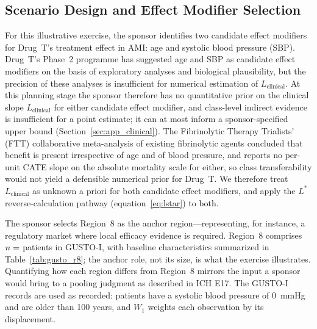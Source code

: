 \documentclass[AMA,Times1COL]{WileyNJDv5}
\begin{document}
\subsection{Scenario Design and Effect Modifier Selection}\label{sec:app_scenario}

For this illustrative exercise, the sponsor identifies two candidate effect modifiers for Drug~T's treatment effect in AMI: age and systolic blood pressure (SBP). Drug~T's Phase~2 programme has suggested age and SBP as candidate effect modifiers on the basis of exploratory analyses and biological plausibility, but the precision of these analyses is insufficient for numerical estimation of $L_{\text{clinical}}$. At this planning stage the sponsor therefore has no quantitative prior on the clinical slope $L_{\text{clinical}}$ for either candidate effect modifier, and class-level indirect evidence is insufficient for a point estimate; it can at most inform a sponsor-specified upper bound (Section~\ref{sec:app_clinical}). The Fibrinolytic Therapy Trialists' (FTT) collaborative meta-analysis of existing fibrinolytic agents\cite{ftt1994} concluded that benefit is present irrespective of age and of blood pressure, and reports no per-unit CATE slope on the absolute mortality scale for either, so class transferability would not yield a defensible numerical prior for Drug~T. We therefore treat $L_{\text{clinical}}$ as unknown a priori for both candidate effect modifiers, and apply the $L^*$ reverse-calculation pathway (equation~\ref{eq:lstar}) to both.

The sponsor selects Region~8 as the anchor region---representing, for instance, a regulatory market where local efficacy evidence is required. Region~8 comprises $n = \numval{nR8}$ patients in GUSTO-I, with baseline characteristics summarized in Table~\ref{tab:gusto_r8}; the anchor role, not its size, is what the exercise illustrates. Quantifying how each region differs from Region~8 mirrors the input a sponsor would bring to a pooling judgment as described in ICH E17.\cite{iche17} The GUSTO-I records are used as recorded:  patients have a systolic blood pressure of 0~mmHg and  are older than 100 years, and $W_1$ weights each observation by its displacement.
\end{document}

